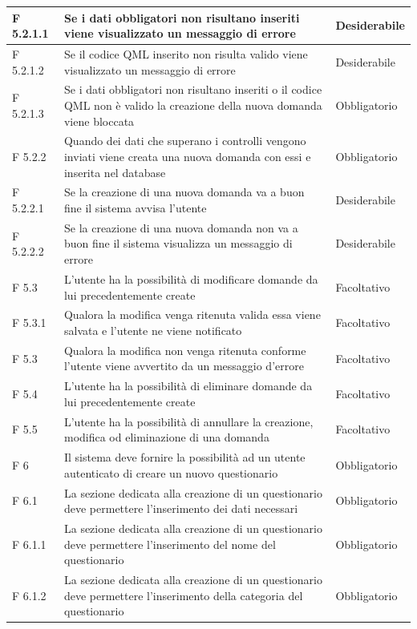\documentclass[a4paper,11pt]{article}
\begin{document}
\begin{longtable}{p{}p{}p{}}
\midrule
F 5.2.1.1 & Se i dati obbligatori non risultano inseriti viene visualizzato un messaggio di errore & Desiderabile\\
\midrule
F 5.2.1.2 & Se il codice QML inserito non risulta valido viene visualizzato un messaggio di errore & Desiderabile\\
\midrule
F 5.2.1.3 & Se i dati obbligatori non risultano inseriti o il codice QML non è valido la creazione della nuova domanda viene bloccata & Obbligatorio\\
\midrule
F 5.2.2 & Quando dei dati che superano i controlli vengono inviati viene creata una nuova domanda con essi e inserita nel database & Obbligatorio\\
\midrule
F 5.2.2.1 & Se la creazione di una nuova domanda va a buon fine il sistema avvisa l'utente & Desiderabile\\
\midrule
F 5.2.2.2 & Se la creazione di una nuova domanda non va a buon fine il sistema visualizza un messaggio di errore & Desiderabile\\
\midrule
F 5.3 & L'utente ha la possibilità di modificare domande da lui precedentemente create & Facoltativo\\
\midrule
F 5.3.1 & Qualora la modifica venga ritenuta valida essa viene salvata e l'utente ne viene notificato & Facoltativo\\
\midrule
F 5.3 & Qualora la modifica non venga ritenuta conforme l'utente viene avvertito da un messaggio d'errore & Facoltativo\\
\midrule
F 5.4 & L'utente ha la possibilità di eliminare domande da lui precedentemente create & Facoltativo\\
\midrule
F 5.5 & L'utente ha la possibilità di annullare la creazione, modifica od eliminazione di una domanda & Facoltativo\\
\midrule
F 6 & Il sistema deve fornire la possibilità ad un utente autenticato di creare un nuovo questionario & Obbligatorio\\
\midrule
F 6.1 & La sezione dedicata alla creazione di un questionario deve permettere l'inserimento dei dati necessari & Obbligatorio\\
\midrule
F 6.1.1 & La sezione dedicata alla creazione di un questionario deve permettere l'inserimento del nome del questionario & Obbligatorio\\
\midrule
F 6.1.2 & La sezione dedicata alla creazione di un questionario deve permettere l'inserimento della categoria del questionario & Obbligatorio\\
\midrule

\end{longtable}
\end{document}
